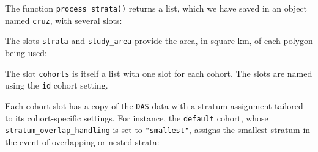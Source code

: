\documentclass[
]{book}
\newenvironment{Shaded}{\begin{snugshade}}{\end{snugshade}}
\newcommand{\DecValTok}[1]{\textcolor[rgb]{0.00,0.00,0.81}{#1}}
\newcommand{\FloatTok}[1]{\textcolor[rgb]{0.00,0.00,0.81}{#1}}
\newcommand{\NormalTok}[1]{#1}
\newcommand{\OperatorTok}[1]{\textcolor[rgb]{0.81,0.36,0.00}{\textbf{#1}}}
\newcommand{\StringTok}[1]{\textcolor[rgb]{0.31,0.60,0.02}{#1}}
\begin{document}
The function \texttt{process\_strata()} returns a list, which we have saved in an object named \texttt{cruz}, with several slots:

\begin{Shaded}
\end{Shaded}

The slots \texttt{strata} and \texttt{study\_area} provide the area, in square km, of each polygon being used:

\begin{Shaded}
\end{Shaded}

\begin{Shaded}
\end{Shaded}

The slot \texttt{cohorts} is itself a list with one slot for each cohort. The slots are named using the \texttt{id} cohort setting.

\begin{Shaded}
\end{Shaded}

Each cohort slot has a copy of the \texttt{DAS} data with a stratum assignment tailored to its cohort-specific settings. For instance, the \texttt{default} cohort, whose \texttt{stratum\_overlap\_handling} is set to \texttt{"smallest"}, assigns the smallest stratum in the event of overlapping or nested strata:
\end{document}
